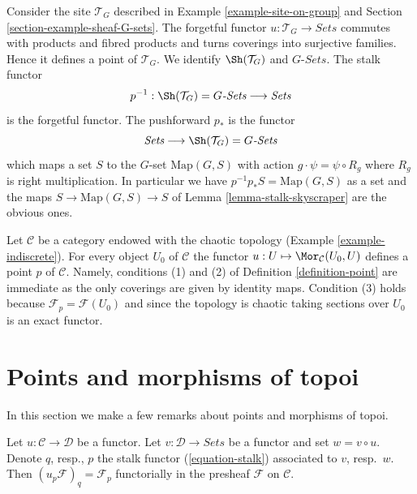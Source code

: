 \begin{example}
\label{example-point-G-sets}
Consider the site $\mathcal{T}_G$ described in
Example \ref{example-site-on-group} and
Section \ref{section-example-sheaf-G-sets}.
The forgetful functor $u : \mathcal{T}_G \to \textit{Sets}$
commutes with products and fibred products and turns
coverings into surjective families. Hence it defines a point
of $\mathcal{T}_G$. We identify $\Sh(\mathcal{T}_G)$
and $G\textit{-Sets}$. The stalk functor
$$
p^{-1} :
\Sh(\mathcal{T}_G) = G\textit{-Sets}
\longrightarrow
\textit{Sets}
$$
is the forgetful functor. The pushforward $p_*$ is the
functor
$$
\textit{Sets}
\longrightarrow
\Sh(\mathcal{T}_G) = G\textit{-Sets}
$$
which maps a set $S$ to the $G$-set $\text{Map}(G, S)$ with
action $g \cdot \psi = \psi \circ R_g$ where $R_g$ is right
multiplication. In particular we have
$p^{-1}p_*S = \text{Map}(G, S)$ as a set and the maps
$S \to \text{Map}(G, S) \to S$ of
Lemma \ref{lemma-stalk-skyscraper}
are the obvious ones.
\end{example}

\begin{example}
\label{example-indiscrete-points}
Let $\mathcal{C}$ be a category endowed with the chaotic topology
(Example \ref{example-indiscrete}). For every object $U_0$ of $\mathcal{C}$
the functor $u : U \mapsto \Mor_\mathcal{C}(U_0, U)$ defines a point
$p$ of $\mathcal{C}$. Namely, conditions (1) and (2) of
Definition \ref{definition-point} are immediate as the only coverings
are given by identity maps. Condition (3) holds because
$\mathcal{F}_p = \mathcal{F}(U_0)$ and since the topology is chaotic
taking sections over $U_0$ is an exact functor.
\end{example}





\section{Points and morphisms of topoi}
\label{section-functorial-points}

\noindent
In this section we make a few remarks about points and morphisms
of topoi.

\begin{lemma}
\label{lemma-point-functor}
Let $u : \mathcal{C} \to \mathcal{D}$ be a functor. Let
$v : \mathcal{D} \to \textit{Sets}$ be a functor and set
$w = v \circ u$. Denote $q$, resp., $p$ the stalk functor
(\ref{equation-stalk}) associated to $v$, resp.\ $w$.
Then $(u_p\mathcal{F})_q = \mathcal{F}_p$ functorially in the
presheaf $\mathcal{F}$ on $\mathcal{C}$.
\end{lemma}

